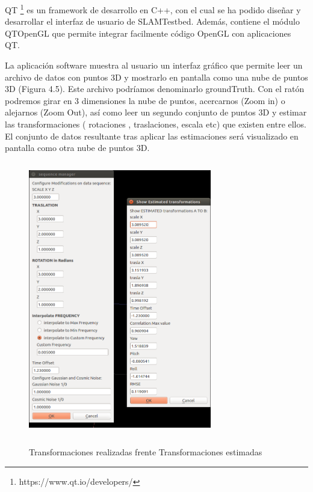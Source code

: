 QT \footnote{https://www.qt.io/developers/} es un framework de desarrollo en C++, con el cual se ha podido diseñar y desarrollar el interfaz de usuario de SLAMTestbed. Además, contiene el módulo QTOpenGL que permite integrar facilmente código OpenGL con aplicaciones QT.

La aplicación software muestra al usuario un interfaz gráfico que permite leer un archivo de datos con puntos 3D y mostrarlo en pantalla como una nube de puntos 3D (Figura 4.5). Este archivo podríamos denominarlo groundTruth.
Con el ratón podremos girar en 3 dimensiones la nube de puntos, acercarnos  (Zoom in) o alejarnos (Zoom Out), así como leer un segundo conjunto de puntos 3D y estimar las transformaciones ( rotaciones , traslaciones, escala etc) que existen entre ellos. El conjunto de datos resultante tras aplicar las estimaciones será visualizado en pantalla como otra nube de puntos 3D.

\begin{figure}[H]
\begin{center}
\label{fig:Transformaciones versus Estimaciones}\includegraphics[height=12.0cm,width=8.0cm]{img/cap5/showTransformationsEstimated.png}
\hspace{0.5cm}
\end{center}
\caption{Transformaciones realizadas frente Transformaciones estimadas }
\end{figure}


